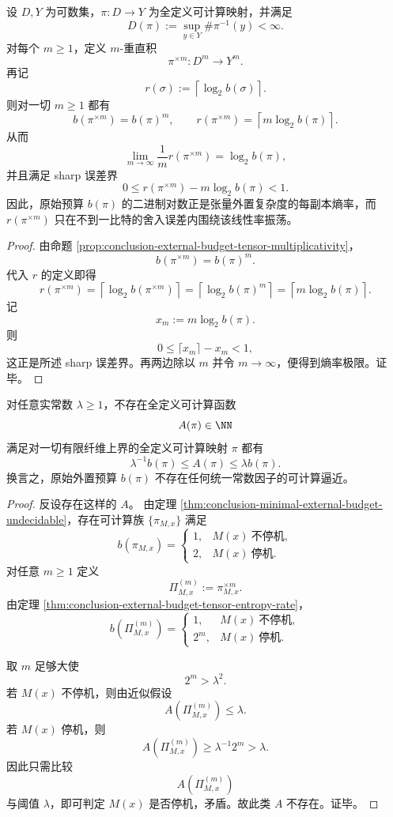 \begin{theorem}[外置预算张量塔的熵率精确律]\label{thm:conclusion-external-budget-tensor-entropy-rate}
设 \(D,Y\) 为可数集，\(\pi:D\to Y\) 为全定义可计算映射，并满足
\[
D(\pi):=\sup_{y\in Y}\#\pi^{-1}(y)<\infty.
\]
对每个 \(m\ge 1\)，定义 \(m\)-重直积
\[
\pi^{\times m}:D^m\to Y^m.
\]
再记
\[
r(\sigma):=\left\lceil\log_2 b(\sigma)\right\rceil.
\]
则对一切 \(m\ge 1\) 都有
\[
b(\pi^{\times m})=b(\pi)^m,
\qquad
r(\pi^{\times m})
=
\left\lceil m\log_2 b(\pi)\right\rceil.
\]
从而
\[
\lim_{m\to\infty}\frac{1}{m}r(\pi^{\times m})=\log_2 b(\pi),
\]
并且满足 sharp 误差界
\[
0\le r(\pi^{\times m})-m\log_2 b(\pi)<1.
\]
因此，原始预算 \(b(\pi)\) 的二进制对数正是张量外置复杂度的每副本熵率，而 \(r(\pi^{\times m})\) 只在不到一比特的舍入误差内围绕该线性率振荡。
\end{theorem}
\begin{proof}
由命题 \ref{prop:conclusion-external-budget-tensor-multiplicativity}，
\[
b(\pi^{\times m})=b(\pi)^m.
\]
代入 \(r\) 的定义即得
\[
r(\pi^{\times m})
=
\left\lceil\log_2 b(\pi^{\times m})\right\rceil
=
\left\lceil\log_2 b(\pi)^m\right\rceil
=
\left\lceil m\log_2 b(\pi)\right\rceil.
\]
记
\[
x_m:=m\log_2 b(\pi).
\]
则
\[
0\le \lceil x_m\rceil-x_m<1,
\]
这正是所述 sharp 误差界。再两边除以 \(m\) 并令 \(m\to\infty\)，便得到熵率极限。证毕。
\end{proof}

\begin{theorem}[原始外置预算不存在统一常数因子近似]\label{thm:conclusion-external-budget-no-computable-constant-factor-approx}
对任意实常数 \(\lambda\ge 1\)，不存在全定义可计算函数
\[
A(\pi)\in\NN
\]
满足对一切有限纤维上界的全定义可计算映射 \(\pi\) 都有
\[
\lambda^{-1}b(\pi)\le A(\pi)\le \lambda b(\pi).
\]
换言之，原始外置预算 \(b(\pi)\) 不存在任何统一常数因子的可计算逼近。
\end{theorem}
\begin{proof}
反设存在这样的 \(A\)。
由定理 \ref{thm:conclusion-minimal-external-budget-undecidable}，存在可计算族 \(\{\pi_{M,x}\}\) 满足
\[
b(\pi_{M,x})=
\begin{cases}
1,& M(x)\ \text{不停机},\\
2,& M(x)\ \text{停机}.
\end{cases}
\]
对任意 \(m\ge 1\) 定义
\[
\Pi_{M,x}^{(m)}:=\pi_{M,x}^{\times m}.
\]
由定理 \ref{thm:conclusion-external-budget-tensor-entropy-rate}，
\[
b(\Pi_{M,x}^{(m)})=
\begin{cases}
1,& M(x)\ \text{不停机},\\
2^m,& M(x)\ \text{停机}.
\end{cases}
\]

取 \(m\) 足够大使
\[
2^m>\lambda^2.
\]
若 \(M(x)\) 不停机，则由近似假设
\[
A(\Pi_{M,x}^{(m)})\le \lambda.
\]
若 \(M(x)\) 停机，则
\[
A(\Pi_{M,x}^{(m)})\ge \lambda^{-1}2^m>\lambda.
\]
因此只需比较
\[
A(\Pi_{M,x}^{(m)})
\]
与阈值 \(\lambda\)，即可判定 \(M(x)\) 是否停机，矛盾。故此类 \(A\) 不存在。证毕。
\end{proof}
